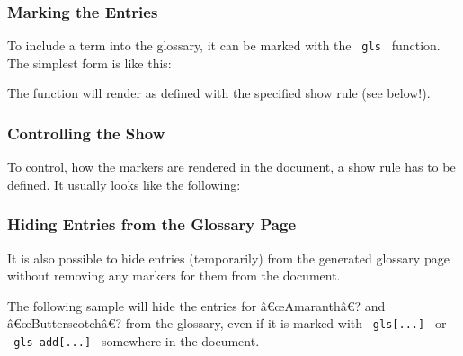 \subsubsection{Marking the Entries}\label{marking-the-entries}

To include a term into the glossary, it can be marked with the
\texttt{\ gls\ } function. The simplest form is like this:

\begin{Shaded}
\begin{Highlighting}[]
\end{Highlighting}
\end{Shaded}

The function will render as defined with the specified show rule (see
below!).

\subsubsection{Controlling the Show}\label{controlling-the-show}

To control, how the markers are rendered in the document, a show rule
has to be defined. It usually looks like the following:

\begin{Shaded}
\begin{Highlighting}[]
\end{Highlighting}
\end{Shaded}

\subsubsection{Hiding Entries from the Glossary
Page}\label{hiding-entries-from-the-glossary-page}

It is also possible to hide entries (temporarily) from the generated
glossary page without removing any markers for them from the document.

The following sample will hide the entries for â€œAmaranthâ€? and
â€œButterscotchâ€? from the glossary, even if it is marked with
\texttt{\ gls{[}...{]}\ } or \texttt{\ gls-add{[}...{]}\ } somewhere in
the document.

\begin{Shaded}
\begin{Highlighting}[]
\NormalTok{    )}

\end{Highlighting}
\end{Shaded}

